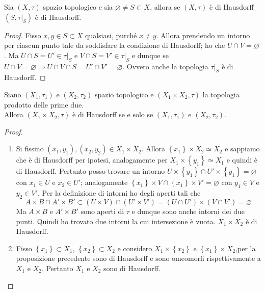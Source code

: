 \begin{theorem}
	Sia $(X, \tau)$ spazio topologico e sia $\varnothing \neq S \subset X$, allora se $(X, \tau)$ è di Hausdorff $(S, \tau|_S)$ è di Hausdorff. 
\end{theorem} 
\begin{proof}
	Fisso $x,y \in S \subset X$ qualsiasi, purché $x \neq y$. Allora prendendo un intorno per ciascun punto tale da soddisfare la condizione di Hausdorff; ho che $U \cap V = \varnothing$. Ma $U \cap S = U' \in \tau|_S$ e $V \cap S = V' \in \tau|_S$ e dunque se $U \cap V = \varnothing \Longrightarrow U \cap V \cap S = U' \cap V' = \varnothing$. Ovvero anche la topologia $\tau|_S$ è di Hausdorff.
\end{proof}

\begin{theorem}
	Siano $(X_1, \tau_1)$ e $(X_2, \tau_2)$ spazio topologico e $(X_1 \times X_2, \tau)$ la topologia prodotto delle prime due. \\Allora $(X_1 \times X_2, \tau)$ è di Hausdorff se e solo se $(X_1, \tau_1)$ e $(X_2, \tau_2)$.
\end{theorem} 
\begin{proof} \
	\begin{enumerate}
		\item Si fissino $(x_1, y_1), (x_2, y_2) \in X_1 \times X_2$. Allora $\left\{x_1\right\} \times X_2 \simeq X_2$ e sappiamo che è di Hausdorff per ipotesi, analogamente per $X_1 \times \left\{y_1\right\} \simeq X_1$ e quindi è di Hausdorff. Pertanto posso trovare un intorno $U \times \left\{y_1\right\} \cap U' \times \left\{y_1\right\} = \varnothing$ con $x_1 \in U$ e $x_2 \in U'$; analogamente $\left\{x_1\right\} \times V \cap \left\{x_1\right\} \times V' = \varnothing$ con $y_1 \in V$ e $y_2 \in V'$. Per la definizione di intorni ho degli aperti tali che 
		\begin{equation*}
		A \times B \cap A' \times B' \subset (U \times V) \cap (U' \times V') = (U \cap U') \times (V \cap V') = \varnothing
		\end{equation*}
		Ma $A \times B$ e $A' \times B'$ sono aperti di $\tau$ e dunque sono anche intorni dei due punti. Quindi ho trovato due intorni la cui intersezione è vuota. $X_1 \times X_2$ è di Hausdorff.
		\item Fisso $\left\{x_1\right\} \subset X_1$, $\left\{x_2\right\} \subset X_2$ e considero $X_1 \times \left\{x_2\right\}$ e $\left\{x_1\right\} \times X_2$,per la proposizione precedente sono di Hausdorff e sono omeomorfi rispettivamente a $X_1$ e $X_2$. Pertanto $X_1$ e $X_2$ sono di Hausdorff.
	\end{enumerate}
\end{proof}

